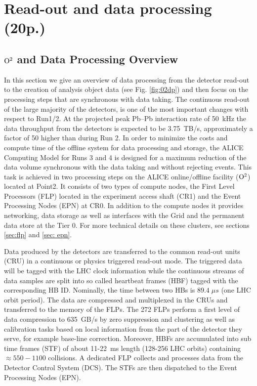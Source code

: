 \section{Read-out and data processing (20p.)}
\subsection{${\rm O}^2$ and Data Processing Overview}
In this section we give an overview of data processing from the detector read-out to the creation of analysis object data (see Fig. \ref{fig:02dp})
and then
focus on the processing steps that are synchronous with data taking.
The continuous read-out of the large majority of the detectors, is one of the most important changes with respect to Run1/2.
At the projected peak Pb--Pb interaction rate of 50~kHz the data throughput from the 
detectors is expected to be 3.75~TB/s, approximately a factor of 50 higher than during Run 2.
In order to minimize the costs and compute time of the offline system for data 
processing and storage, the ALICE Computing Model for Runs 3 and 4 is designed 
for a maximum reduction of the data volume synchronous with the data taking and without rejecting events. 
This task is achieved in two processing steps on the ALICE online/offline facility (${\rm O}^2$) located at Point2.
It consists of two types of compute nodes, the First Level Processors (FLP) located in the 
experiment access shaft (CR1) and the Event Processing Nodes (EPN) at CR0. In addition to the compute 
nodes it provides networking, data storage as well as interfaces with the Grid and the permanent data 
store at the Tier
0. For more technical details on these clusters, see sections \ref{sec:flp} and \ref{sec: epn}.

Data produced by the detectors are transferred to the common read-out units (CRU) in a continuous or
physics triggered read-out mode. The triggered data will be tagged with the LHC clock information while 
the continuous streams of data samples are split into so called heartbeat frames (HBF) tagged with the 
corresponding HB ID. Nominally, the time between two HBs is $89.4 \; \mu s$ (one LHC orbit period).
The data are compressed and multiplexed
in the CRUs and transferred to the memory of the FLPs.
The 272 FLPs perform a 
first level of data compression to 635~GB/s by zero suppression and clustering as well as calibration 
tasks based on local information from the part of the detector they serve, for example base-line 
correction.
Moreover, HBFs are accumulated into sub time frames (STF) of about 11-22~ms length (128-256 LHC orbits) 
containing $\approx 550-1100$ collisions. A dedicated FLP collects and processes data from the Detector 
Control System (DCS).
The STFs are then dispatched to the Event Processing Nodes (EPN). 

